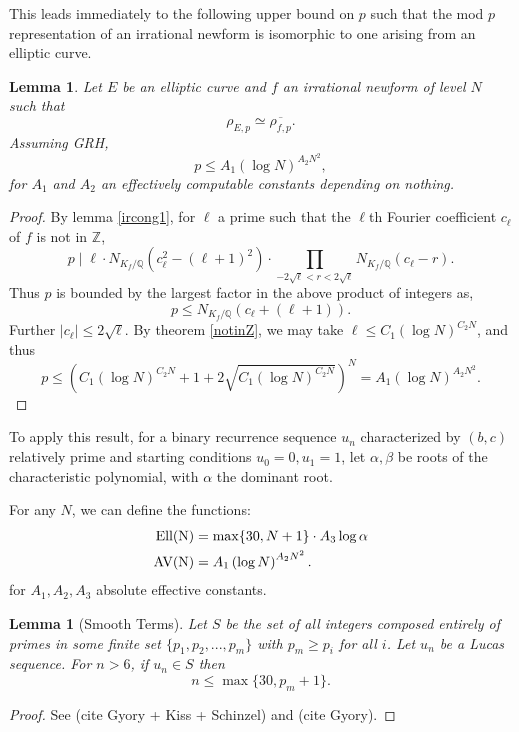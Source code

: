 \documentclass[12pt]{amsart}
\newtheorem{lem}[thm]{Lemma}
\theoremstyle{definition}
\def\Z{{\mathbb Z}}
\renewcommand{\bar}{\overline}
\newcommand{\Ell}{\rm Ell}
\newcommand{\AV}{\rm AV}
\begin{document}
This leads immediately to the following upper bound on $p$ such that the mod $p$ representation of an irrational newform is isomorphic to one arising from an elliptic curve.

\begin{lem}\label{irboundp}
Let $E$ be an elliptic curve and $f$ an irrational newform of level $N$ such that 
\[\rho_{E,p} \simeq \bar{\rho_{f,p}}.\]
Assuming GRH, 
\[ p \leq  A_1 \left( \log{N} \right)^{A_2N^2}, \]
for $A_1$ and $A_2$ an effectively computable constants depending on nothing.
\end{lem}
\begin{proof}
By lemma \ref{ircong1}, for $\ell$ a prime such that the $\ell$th Fourier coefficient $c_\ell$ of $f$ is not in $\Z$, 
\[ p \mid \ell \cdot N_{K_f / \mathbb{Q}}(c_\ell^2-(\ell+1)^2) \cdot \prod_{-2\sqrt{\ell} < r < 2\sqrt{\ell}}{N_{K_f / \mathbb{Q}}}(c_\ell - r).\]
Thus $p$ is bounded by the largest factor in the above product of integers as,
\[ p \leq N_{K_f / \mathbb{Q}}(c_\ell+(\ell+1)) .\]
Further $|c_\ell| \leq 2\sqrt{\ell}$.  By theorem \ref{notinZ}, we may take $\ell \leq C_1 \left( \log{N} \right)^{C_2N}$, and thus
\[ p \leq \left( C_1 \left( \log{N} \right)^{C_2N} + 1 + 2 \sqrt{C_1  \left(\log{N} \right)^{C_2N}}\right)^N = A_1 \left( \log{N} \right)^{A_2N^2}. \]
\end{proof}

To apply this result, for a binary recurrence sequence $u_n$ characterized by $(b,c)$ relatively prime and starting conditions $u_0=0,u_1=1$, let $\alpha,\beta$ be roots of the characteristic polynomial, with $\alpha$ the dominant root.  

For any $N$, we can define the functions:
\begin{align*}
\Ell(N) & = \max\{30, N+1\} \cdot A_3\log{\alpha} \\
\AV(N) & = A_1 \left( \log{N} \right)^{A_2N^2}. 
\end{align*}
for $A_1,A_2, A_3$ absolute effective constants.

\begin{lem}[Smooth Terms]\label{smoothterm}
Let $S$ be the set of all integers composed entirely of primes in some finite set $\{p_1,p_2,...,p_m\}$ with $p_m \geq p_i$ for all $i$.  Let $u_n$ be a Lucas sequence.  For $n > 6$, if $u_n \in S$ then
\[ n \leq \max\{30, p_m +1 \}. \]
\end{lem}
\begin{proof}
See (cite Gyory + Kiss + Schinzel) and (cite Gyory).
\end{proof}
\end{document}
